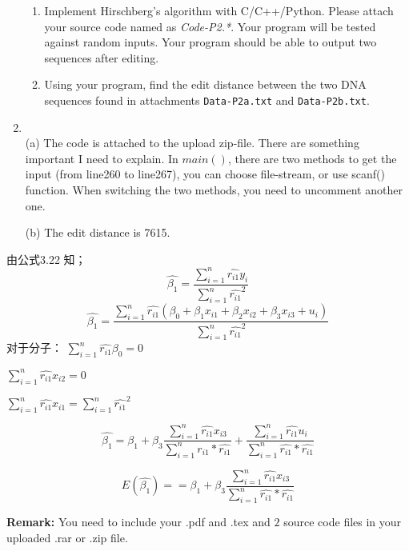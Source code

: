 \documentclass[12pt,a4paper]{article}
\makeatletter
\newtheorem*{solution}{Solution}
\theoremstyle{definition}
\renewenvironment{solution}[1][Solution] {\par\pushQED{\qed}\normalfont\topsep6\p@\@plus6\p@\relax\trivlist\item[\hskip\labelsep\bfseries#1\@addpunct{.}]\ignorespaces}{\popQED\endtrivlist\@endpefalse} \makeatother
\makeatother
\begin{document}
\begin{enumerate}
    \begin{enumerate}
        \item
        Implement Hirschberg's algorithm with C/C++/Python. Please attach your source code named as {\color{red}\emph{Code-P2.*}}. Your program will be tested against random inputs. Your program should be able to output two sequences after editing.

        \item
        Using your program, find the edit distance between the two DNA sequences found in attachments \texttt{Data-P2a.txt} and \texttt{Data-P2b.txt}.
    \end{enumerate}
    \begin{solution}
    	~\\
      (a) The code is attached to the upload zip-file. There are something important I need to explain. In $main()$, there are two methods to get the input (from line260 to line267), you can choose file-stream, or use scanf() function. When switching the two methods, you need to uncomment another one.
      
      (b) The edit distance is 7615. 
   \end{solution}

\end{enumerate}









由公式3.22 知；
$$\hat{\beta_1}=\frac{\sum_{i=1}^{n}{\hat{r_{i1}}y_i}}{\sum_{i=1}^{n}{\hat{r_{i1}}^2 }} $$
$$\hat{\beta_1}=\frac{\sum_{i=1}^{n}{\hat{r_{i1}}(\beta_0+\beta_1x_{i1}+\beta_2x_{i2}+\beta_3x_{i3}+u_i )}}{\sum_{i=1}^{n}{\hat{r_{i1}}^2 }}  $$
对于分子：
$ \sum_{i=1}^{n}{\hat{r_{i1}}\beta_0}=0 $

 $\sum_{i=1}^{n}{\hat{r_{i1}}x_{i2}}=0$

$\sum_{i=1}^{n}{\hat{r_{i1}}x_{i1}}=\sum_{i=1}^{n}{\hat{r_{i1}}^2 }$

$$\hat{\beta_1}=\beta_1+\beta_3\frac{\sum_{i=1}^{n}\hat{r_{i1}}x_{i3}}{\sum_{i=1}^{n}\hat{r_{i1}}*\hat{r_{i1}}}+\frac{\sum_{i=1}^{n}\hat{r_{i1}}u_{i}}{\sum_{i=1}^{n}\hat{r_{i1}}*\hat{r_{i1}}} $$



$$E(\hat{\beta_1})==\beta_1+\beta_3\frac{\sum_{i=1}^{n}\hat{r_{i1}}x_{i3}}{\sum_{i=1}^{n}\hat{r_{i1}}*\hat{r_{i1}}} $$




\vspace{20pt}

\textbf{Remark:} You need to include your .pdf and .tex and {\color{red}\emph{$2$}} source code files in your uploaded .rar or .zip file.

\end{document}
